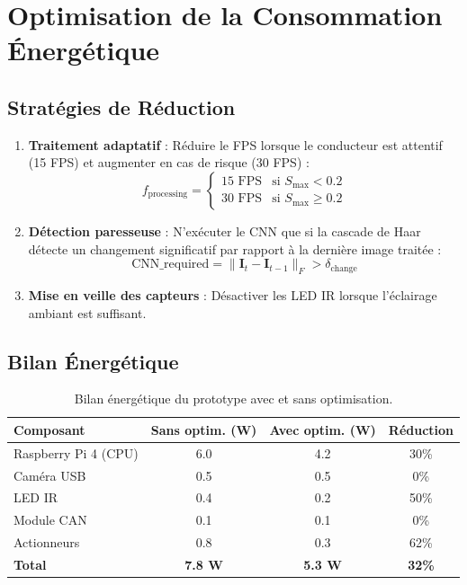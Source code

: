 \documentclass[12pt,a4paper,twoside]{report}
\begin{document}
\section{Optimisation de la Consommation Énergétique}

\subsection{Stratégies de Réduction}

\begin{enumerate}[leftmargin=2cm]
    \item \textbf{Traitement adaptatif} : Réduire le FPS lorsque le conducteur est attentif (15 FPS) et augmenter en cas de risque (30 FPS) :
    \begin{equation}
    f_{\text{processing}} = \begin{cases}
        15 \text{ FPS} & \text{si } S_{\max} < 0.2 \\
        30 \text{ FPS} & \text{si } S_{\max} \geq 0.2
    \end{cases}
    \label{eq:adaptive_fps}
    \end{equation}
    
    \item \textbf{Détection paresseuse} : N'exécuter le CNN que si la cascade de Haar détecte un changement significatif par rapport à la dernière image traitée :
    \begin{equation}
    \text{CNN\_required} = \|\mathbf{I}_t - \mathbf{I}_{t-1}\|_F > \delta_{\text{change}}
    \label{eq:lazy_detection}
    \end{equation}
    
    \item \textbf{Mise en veille des capteurs} : Désactiver les LED IR lorsque l'éclairage ambiant est suffisant.
\end{enumerate}

\subsection{Bilan Énergétique}

\begin{table}[H]
\centering
\caption{Bilan énergétique du prototype avec et sans optimisation.}
\label{tab:energy_budget}
\renewcommand{\arraystretch}{1.3}
\begin{tabular}{|l|c|c|c|}
\hline
\rowcolor{stellantisblue!15}
\textbf{Composant} & \textbf{Sans optim. (W)} & \textbf{Avec optim. (W)} & \textbf{Réduction} \\
\hline
Raspberry Pi 4 (CPU) & 6.0 & 4.2 & 30\% \\
\hline
Caméra USB & 0.5 & 0.5 & 0\% \\
\hline
LED IR & 0.4 & 0.2 & 50\% \\
\hline
Module CAN & 0.1 & 0.1 & 0\% \\
\hline
Actionneurs & 0.8 & 0.3 & 62\% \\
\hline
\textbf{Total} & \textbf{7.8 W} & \textbf{5.3 W} & \textbf{32\%} \\
\hline
\end{tabular}
\end{table}
\end{document}
